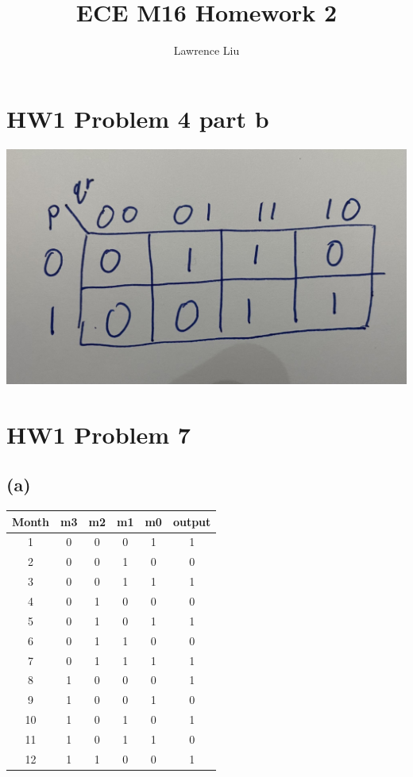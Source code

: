 \documentclass[12pt]{article}
\title{ECE M16 Homework 2}
\author{Lawrence Liu}
\begin{document}
\maketitle
\section*{HW1 Problem  4 part b}
\includegraphics[scale=0.15]{../HW1/Kmap.jpg}
\section*{HW1 Problem 7}
\subsection*{(a)}
\begin{center}
    \begin{tabular}{|c|c|c|c|c|c|}
        Month & m3 & m2 & m1 & m0 & output \\
        \hline
        1 & 0 & 0 & 0 & 1 & 1 \\
        \hline
        2 & 0 & 0 & 1 & 0 & 0 \\
        \hline
        3 & 0 & 0 & 1 & 1 & 1 \\
        \hline
        4 & 0 & 1 & 0 & 0 & 0 \\
        \hline
        5 & 0 & 1 & 0 & 1 & 1 \\
        \hline
        6 & 0 & 1 & 1 & 0 & 0 \\
        \hline
        7 & 0 & 1 & 1 & 1 & 1 \\
        \hline
        8 & 1 & 0 & 0 & 0 & 1 \\
        \hline
        9 & 1 & 0 & 0 & 1 & 0 \\
        \hline
        10 & 1 & 0 & 1 & 0 & 1 \\
        \hline
        11 & 1 & 0 & 1 & 1 & 0 \\
        \hline
        12 & 1 & 1 & 0 & 0 & 1 \\
        \hline
    \end{tabular}
\end{center}
\end{document}
